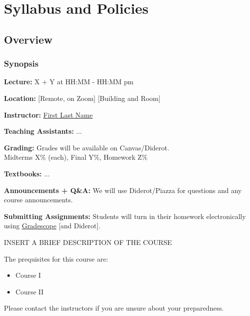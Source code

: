 \chapter{Syllabus and Policies}
\label{policies}
\begin{preamble}
\end{preamble}

\section{Overview}

\subsection{Synopsis}

\begin{gram}
\textbf{Lecture:}
X + Y at HH:MM - HH:MM pm

\textbf{Location:} 
[Remote, on Zoom] [Building and Room]

\textbf{Instructor:} 
\href{https}{First Last Name} 

\textbf{Teaching Assistants:} ...

\textbf{Grading:} 
Grades will be available on Canvas/Diderot.
\\
Midterms X\% (each), Final Y\%, Homework Z\%

\textbf{Textbooks:} 
...

\textbf{Announcements + Q\&A:} We will use Diderot/Piazza for questions and any course announcements.

\textbf{Submitting Assignments:} 
Students will turn in their homework electronically using \href{https://www.gradescope.com}{Gradescope} [and Diderot].
\end{gram}


\begin{gram}
INSERT A BRIEF DESCRIPTION OF THE COURSE
\end{gram}
      
\begin{gram}
The prequisites for this course are:
          \begin{itemize}
            \item Course I
            \item Course II
            \end{itemize}

Please contact the instructors if you are unsure about your preparedness.
\end{gram}

